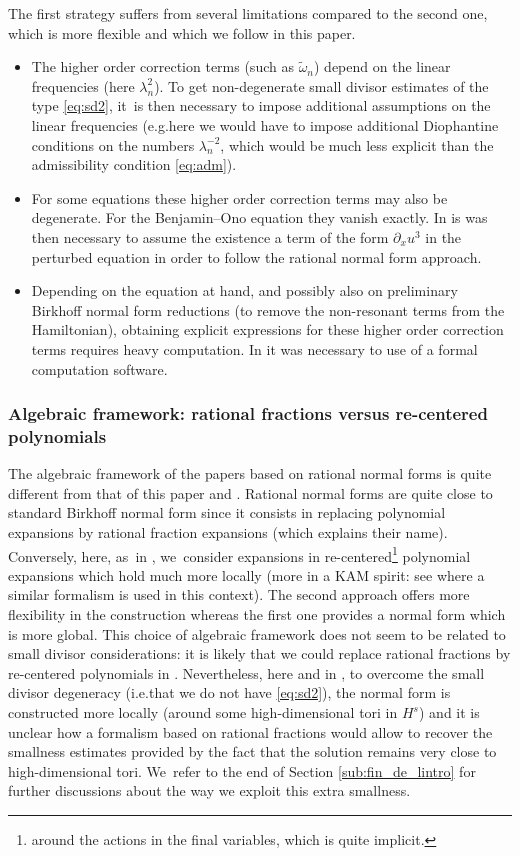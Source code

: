 \documentclass[10pt,a4paper]{amsart}
\providecommand{\ie}{i.e.}
\providecommand{\eg}{e.g.}
\theoremstyle{plain}
\theoremstyle{definition}
\newcommand{\1}{\mathbf{1}}
\providecommand{\Subsubsection}{\subsubsection}
\providecommand{\Subsubsection}{\subsubsection}
\begin{document}
The first strategy suffers from several limitations compared to the second one, which is more flexible and which we follow in this paper.
\begin{itemize}
\item The higher order correction terms (such as $\widetilde{\omega}_n$) depend on the linear frequencies (here $\lambda_n^2$). To get non-degenerate small divisor estimates of the type \eqref{eq:sd2}, it~is then necessary to impose additional assumptions on the linear frequencies (\eg here we would have to impose additional Diophantine conditions on the numbers $\lambda_n^{-2}$, which would be much less explicit than the admissibility condition \eqref{eq:adm}).
\item For some equations these higher order correction terms may also be degenerate. For the Benjamin--Ono equation they vanish exactly. In \cite{KtA} is was then necessary to assume the existence a term of the form $\partial_x u^3$ in the perturbed equation in order to follow the rational normal form approach.
\item Depending on the equation at hand, and possibly also on preliminary Birkhoff normal form reductions (to remove the non-resonant terms from the Hamiltonian), obtaining explicit expressions for these higher order correction terms requires heavy computation. In \cite{KtA} it was necessary to use of a formal computation software.
\end{itemize}

\Subsubsection{Algebraic framework: rational fractions versus re-centered polynomials} The algebraic framework of the papers based on rational normal forms is quite different from that of this paper and \cite{Bou00}. Rational normal forms are quite close to standard Birkhoff normal form since it consists in replacing polynomial expansions by rational fraction expansions (which explains their name). Conversely, here, as~in \cite{Bou00}, we~consider expansions in re-centered\footnote{around the actions in the final variables, which is quite implicit.} polynomial expansions which hold much more locally (more in a KAM spirit: see \cite{Bou05,BMP21} where a similar formalism is used in this context). The second approach offers more flexibility in the construction whereas the first one provides a normal form which is more global.
This choice of algebraic framework does not seem to be related to small divisor considerations: it is likely that we could replace rational fractions by re-centered polynomials in \cite{KillBill,KtA,LX23,zhiqiang}. Nevertheless, here and in \cite{Bou00}, to overcome the small divisor degeneracy (\ie that we do not have \eqref{eq:sd2}), the normal form is constructed more locally (around some high-dimensional tori in $H^s$) and it is unclear how a formalism based on rational fractions would allow to recover the smallness estimates provided by the fact that the solution remains very close to high-dimensional tori. We~refer to the end of Section \ref{sub:fin_de_lintro} for further discussions about the way we exploit this extra smallness.
\end{document}
